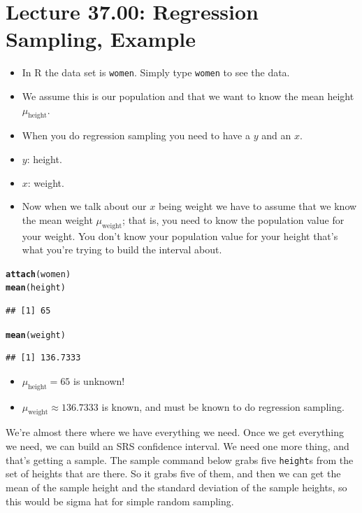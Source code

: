 \documentclass[oneside]{book}\usepackage[]{graphicx}\usepackage[dvipsnames,table,xcdraw]{xcolor}
\makeatletter
\newcommand{\hlstd}[1]{\textcolor[rgb]{0.345,0.345,0.345}{#1}}%
\newcommand{\hlkwd}[1]{\textcolor[rgb]{0.737,0.353,0.396}{\textbf{#1}}}%
\newenvironment{kframe}{%
 \def\at@end@of@kframe{}%
 \ifinner\ifhmode%
  \def\at@end@of@kframe{\end{minipage}}%
  \begin{minipage}{\columnwidth}%
 \fi\fi%
 \def\FrameCommand##1{\hskip\@totalleftmargin \hskip-\fboxsep
 \colorbox{shadecolor}{##1}\hskip-\fboxsep
     \hskip-\linewidth \hskip-\@totalleftmargin \hskip\columnwidth}%
 \MakeFramed {\advance\hsize-\width
   \@totalleftmargin\z@ \linewidth\hsize
   \@setminipage}}%
 {\par\unskip\endMakeFramed%
 \at@end@of@kframe}
\newenvironment{knitrout}{}{} %
\newcommand{\code}[1]{\texttt{#1}}
\makeatother
\begin{document}
\section{Lecture 37.00: Regression Sampling, Example}
\begin{itemize}
    \item In R the data set is \code{women}. Simply type \code{women} to see the data.
    \item We assume this is our population and that we want to know the mean height $\mu_{\text{height}}$.
    \item When you do regression sampling you need to have a $y$ and an $x$.
    \item $y$: height.
    \item $x$: weight.
    \item Now when we talk about our $x$ being weight we have to assume that we know the mean weight $\mu_{\text{weight}}$; that is, you need to know the population value for your weight. You don't know your population value for your height that's what you're trying to build the interval about.
\end{itemize}
\begin{knitrout}
\color{fgcolor}\begin{kframe}
\begin{alltt}
\hlkwd{attach}\hlstd{(women)}
\hlkwd{mean}\hlstd{(height)}
\end{alltt}
\begin{verbatim}
## [1] 65
\end{verbatim}
\begin{alltt}
\hlkwd{mean}\hlstd{(weight)}
\end{alltt}
\begin{verbatim}
## [1] 136.7333
\end{verbatim}
\end{kframe}
\end{knitrout}
\begin{itemize}
    \item $\mu_{\text{height}}=65$ is unknown!
    \item $\mu_{\text{weight}}\approx 136.7333$ is known, and must be known to do regression sampling.
\end{itemize}

We're almost there where we have everything we need. Once we get everything we need,
we can build an SRS confidence interval. We need one more thing, and that's getting
a sample. The sample command below grabs five \code{height}s from the set of heights
that are there. So it grabs five of them, and then we can get the mean of the sample height
and the standard deviation of the sample heights, so this would be sigma hat for simple random sampling.
\end{document}
